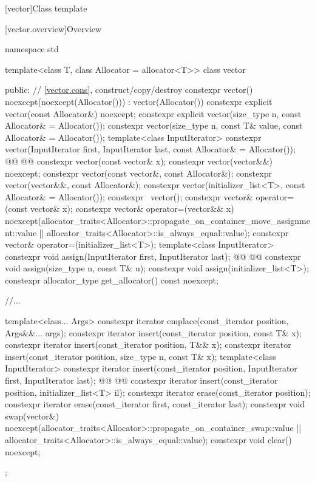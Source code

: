 \documentclass{wg21}
\begin{document}
[vector]{Class template }

[vector.overview]{Overview}

\begin{codeblock}
namespace std {
    template<class T, class Allocator = allocator<T>>
    class vector {
        public:
        // \ref{vector.cons}, construct/copy/destroy
        constexpr vector() noexcept(noexcept(Allocator())) : vector(Allocator()) { }
        constexpr explicit vector(const Allocator&) noexcept;
        constexpr explicit vector(size_type n, const Allocator& = Allocator());
        constexpr vector(size_type n, const T& value, const Allocator& = Allocator());
        template<class InputIterator>
        constexpr vector(InputIterator first, InputIterator last, const Allocator& = Allocator());
        @@
        @@
        constexpr vector(const vector& x);
        constexpr vector(vector&&) noexcept;
        constexpr vector(const vector&, const Allocator&);
        constexpr vector(vector&&, const Allocator&);
        constexpr vector(initializer_list<T>, const Allocator& = Allocator());
        constexpr ~vector();
        constexpr vector& operator=(const vector& x);
        constexpr vector& operator=(vector&& x)
        noexcept(allocator_traits<Allocator>::propagate_on_container_move_assignment::value ||
        allocator_traits<Allocator>::is_always_equal::value);
        constexpr vector& operator=(initializer_list<T>);
        template<class InputIterator>
        constexpr void assign(InputIterator first, InputIterator last);
        @@
        @@
        constexpr void assign(size_type n, const T& u);
        constexpr void assign(initializer_list<T>);
        constexpr allocator_type get_allocator() const noexcept;

        //...

        template<class... Args> constexpr iterator emplace(const_iterator position, Args&&... args);
        constexpr iterator insert(const_iterator position, const T& x);
        constexpr iterator insert(const_iterator position, T&& x);
        constexpr iterator insert(const_iterator position, size_type n, const T& x);
        template<class InputIterator>
        constexpr iterator insert(const_iterator position, InputIterator first, InputIterator last);
        @@
        @@
        constexpr iterator insert(const_iterator position, initializer_list<T> il);
        constexpr iterator erase(const_iterator position);
        constexpr iterator erase(const_iterator first, const_iterator last);
        constexpr void     swap(vector&)
        noexcept(allocator_traits<Allocator>::propagate_on_container_swap::value ||
        allocator_traits<Allocator>::is_always_equal::value);
        constexpr void     clear() noexcept;
    };

}
\end{codeblock}
\end{document}
